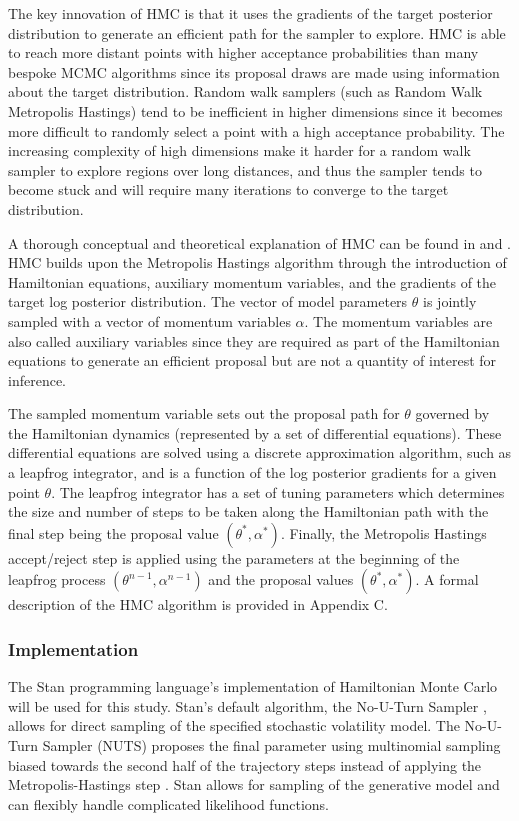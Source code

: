 \documentclass[12pt, a4paper]{article}
\begin{document}
        The key innovation of HMC is that it uses the gradients of the target posterior distribution to generate an efficient path for the sampler to explore. HMC is able to reach more distant points with higher acceptance probabilities than many bespoke MCMC algorithms since its  proposal draws are made using information about the target distribution. Random walk samplers (such as Random Walk Metropolis Hastings) tend to be inefficient in higher dimensions since it becomes more difficult to randomly select a point with a high acceptance probability. The increasing complexity of high dimensions make it harder for a random walk sampler to explore regions over long distances, and thus the sampler tends to become stuck and will require many iterations to converge to the target distribution. 

        A thorough conceptual and theoretical explanation of HMC can be found in \citet{gelman2013bayesian} and \citet{betancourt2017conceptual}. HMC builds upon the Metropolis Hastings algorithm through the introduction of Hamiltonian equations, auxiliary momentum variables, and the gradients of the target log posterior distribution. The vector of model parameters $\theta$ is jointly sampled with a vector of momentum variables $\alpha$. The momentum variables are also called auxiliary variables since they are required as part of the Hamiltonian equations to generate an efficient proposal but are not a quantity of interest for inference.

        The sampled momentum variable sets out the proposal path for $\theta$ governed by the Hamiltonian dynamics (represented by a set of differential equations). These differential equations are solved using a discrete approximation algorithm, such as a leapfrog integrator, and is a function of the log posterior gradients for a given point $\theta$. The leapfrog integrator has a set of tuning parameters which determines the size and number of steps to be taken along the Hamiltonian path with the final step being the proposal value $(\theta^{\ast}, \alpha^{\ast})$. Finally, the Metropolis Hastings accept/reject step is applied using the parameters at the beginning of the leapfrog process $(\theta^{n-1}, \alpha^{n-1})$ and the proposal values $(\theta^{\ast}, \alpha^{\ast})$. A formal description of the HMC algorithm is provided in Appendix C.

        \subsubsection{Implementation}
        The Stan programming language's implementation of Hamiltonian Monte Carlo will be used for this study. Stan's default algorithm, the No-U-Turn Sampler \citep{hoffman2014no}, allows for direct sampling of the specified stochastic volatility model. The No-U-Turn Sampler (NUTS) proposes the final parameter using multinomial sampling biased towards the second half of the trajectory steps instead of applying the Metropolis-Hastings step \citep{betancourt2016identifying}. Stan allows for sampling of the generative model and can flexibly handle complicated likelihood functions. 
        
\end{document}
